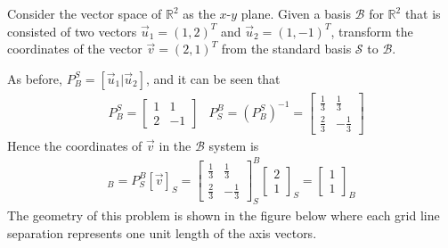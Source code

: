 \begin{exmp}
\label{exmp:2Dtransform}
Consider the vector space of $\mathbb{R}^2$ as the $x$-$y$ plane. Given a basis $\mathcal{B}$ for $\mathbb{R}^2$ that is consisted of two vectors $\vec{u}_1 = (1,2)^T$ and $\vec{u}_2 = (1,-1)^T$, transform the coordinates of the vector $\vec{v} = (2,1)^T$ from the standard basis $\mathcal{S}$ to $\mathcal{B}$.
\end{exmp}
\begin{solution}
As before, $P_B^S = [\vec{u}_1|\vec{u}_2]$, and it can be seen that
\begin{align*}
&P_B^S =
\begin{bmatrix}
1 & 1 \\
2 & -1
\end{bmatrix}
&P_S^B = (P_B^S)^{-1} =
\begin{bmatrix}
\frac{1}{3} & \frac{1}{3} \\
\frac{2}{3} & -\frac{1}{3}
\end{bmatrix}
\end{align*}
Hence the coordinates of $\vec{v}$ in the $\mathcal{B}$ system is
\begin{align*}
[\vec{v}]_B = P_S^B[\vec{v}]_S = 
\begin{bmatrix}
\frac{1}{3} & \frac{1}{3} \\
\frac{2}{3} & -\frac{1}{3}
\end{bmatrix}_S^B
\begin{bmatrix}
2 \\
1
\end{bmatrix}_S
=
\begin{bmatrix}
1\\
1
\end{bmatrix}_B
\end{align*}
The geometry of this problem is shown in the figure below where each grid line separation represents one unit length of the axis vectors.
\begin{center}
\end{center}
\end{solution}
